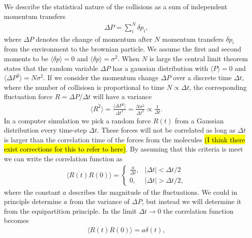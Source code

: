 We describe the statistical nature of the collisions as a sum of
independent momentum transfers
\begin{align*}
  \Delta P = \sum_i^N \delta p_i,
\end{align*}
where $\Delta P$ denotes the change of momentum after $N$ momentum transfers
$\delta p_i$ from the environment to the brownian particle. We assume the first
and second moments to be $\langle \delta p \rangle = 0$ and  $\langle \delta p \rangle
= \sigma^2$. When $N$ is large the central limit theorem states that the random
variable $\Delta P$ has a gaussian distribution with  $\langle P \rangle = 0$
and $\langle \Delta P^2 \rangle = N\sigma^2$. If we consider the momentum change
$\Delta P$  over a discrete time $\Delta t$, where the number of collisiosn is
proportional to time $N \propto \Delta t$, the corresponding fluctuation force
$R = \Delta P / \Delta t$ will have a variance 
\begin{align*}
  \langle R^2 \rangle = \frac{\langle \Delta P^2 \rangle}{\Delta t^2} = \frac{N \sigma^2}{\Delta t^2}  \propto \frac{1}{\Delta t}.
\end{align*}
In a computer simulation we pick a random force $R(t)$ from a Gaussian
distribution every time-step $\Delta t$. These forces will not be correlated as
long as $\Delta t$ is larger than the correlation time of the forces from the
molecules \hl{(I think there exist corrections
for this to refer to here)}. By assuming that this criteria is meet we can write the correlation function as 
\begin{align}
  \langle R(t) R(0) \rangle = 
  \begin{cases}
    \frac{a}{\Delta t}, & |\Delta t| < \Delta t/2 \\
    0, & |\Delta t| > \Delta t/2,
    \label{eq:disc_corr}
  \end{cases}
\end{align}
where the constant $a$ describes the magnitude of the fluctuations. We could in principle determine $a$ from the variance of $\Delta P$, but instead we will determine it from the equipartition principle. In the limit $\Delta t \to 0$ the correlation function becomes
\begin{align}
  \langle R(t)R(0) \rangle = a \delta(t),
  \label{eq:F_corr}
\end{align}
